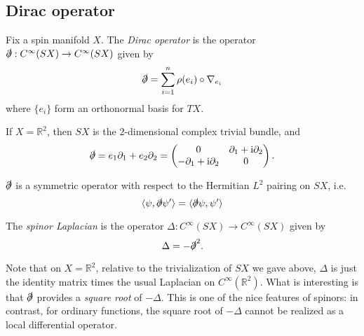 \documentclass[12pt,letterpaper,reqno]{article}
\numberwithin{equation}{section}
\newcommand{\R}{\ensuremath{\mathbb R}}
\newcommand{\dirac}{\slashed{\partial}}
\newcommand{\I}{{\mathrm i}}
\newcommand{\IP}[1]{\langle#1\rangle}
\newcommand{\ti}[1]{\textit{#1}}
\begin{document}
\subsection{Dirac operator}

\begin{defn} Fix a spin manifold $X$.
The \ti{Dirac operator} is the operator
$\dirac: C^\infty(SX) \to C^\infty(SX)$
given by
\begin{equation}
  \dirac = \sum_{i=1}^n \rho(e_i) \circ \nabla_{e_i}
\end{equation}
where $\{e_i\}$ form an orthonormal basis for $TX$.
\end{defn}

\begin{example}[Dirac operator on $\R^2$]
If $X = \R^2$, then $SX$ is the $2$-dimensional complex trivial
bundle, and
\begin{equation}
  \dirac = e_1 \partial_1 + e_2 \partial_2 = \begin{pmatrix} 0 & \partial_1 + \I \partial_2 \\ - \partial_1 + \I \partial_2 & 0 \end{pmatrix}.
\end{equation}
\end{example}

\begin{prop} $\dirac$ is a symmetric operator with respect to the Hermitian $L^2$
pairing on $SX$, i.e.
\begin{equation}
  \IP{\psi, \dirac \psi'} = \IP{\dirac \psi, \psi'}
\end{equation}
\end{prop}

\begin{defn} The \ti{spinor Laplacian}
is the operator
$\Delta: C^\infty(SX) \to C^\infty(SX)$ given by
\begin{equation}
  \Delta = - \dirac^2.
\end{equation}
\end{defn}

Note that on $X = \R^2$, relative to the trivialization of $SX$ we gave above, 
$\Delta$ is just the identity matrix times the usual Laplacian on $C^\infty(\R^2)$.
What is interesting is that $\dirac$ provides a \ti{square root} of $-\Delta$. 
This is one of the nice features of spinors: in contrast, 
for ordinary functions, the square root of $-\Delta$
cannot be realized as a local differential operator.
\end{document}
